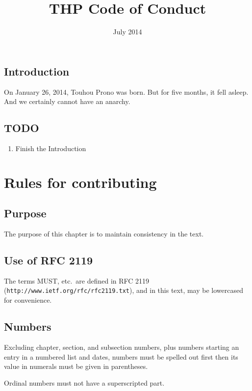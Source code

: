 \documentclass[10pt]{book}
\title{THP Code of Conduct}
\date{July 2014}
\begin{document}
\maketitle

\tableofcontents

\section{Introduction}

On January 26, 2014, Touhou Prono was born. But for five months, it fell asleep. And we certainly cannot have an anarchy.

\section{TODO}

\begin{enumerate}
 \item Finish the Introduction
\end{enumerate}

\chapter{Rules for contributing}

\section{Purpose}

The purpose of this chapter is to maintain consistency in the text.

\section{Use of RFC 2119}

The terms MUST, etc.~are defined in RFC 2119 (\texttt{http://www.ietf.org/rfc/rfc2119.txt}), and in this text, may be lowercased for convenience.

\section{Numbers}

Excluding chapter, section, and subsection numbers, plus numbers starting an entry in a numbered list and dates, numbers must be spelled out first then its value in numerals must be given in parentheses.

Ordinal numbers must not have a superscripted part.
\end{document}
